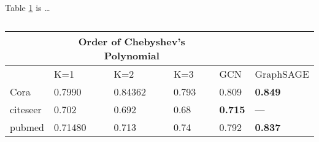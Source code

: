 Table \ref{table:2} is \dots
\begin{table}[h!]
\centering
\caption{}
\begin{tabular}{ |p{2cm}||p{2cm}|p{2cm}|p{2cm}|p{2cm}|p{2cm}|}
 \hline
 &\multicolumn{3}{c}{\textbf{Order of Chebyshev's Polynomial}} &&\\
 \hline
 &K=1& K=2 &K=3 &GCN & GraphSAGE\\
 \hline\hline
 Cora   & 0.7990    &0.84362 &0.793 &0.809 &\textbf{0.849}\\
 citeseer &   0.702  & 0.692 &0.68 &\textbf{0.715}& --- \\
 pubmed &0.71480 & 0.713 &0.74 &0.792 &\textbf{0.837}\\
 \hline
\end{tabular}\\
\label{table:2}
\end{table}
